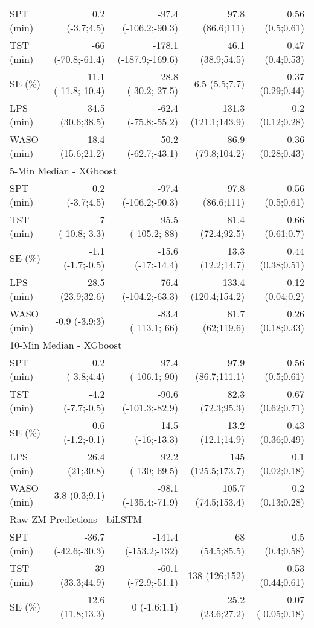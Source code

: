 \documentclass[
  9pt,
]{scrbook}
\begin{document}
\begin{longtable}{lrrrr}
\midrule
SPT (min) & 0.2 (-3.7;4.5) & -97.4 (-106.2;-90.3) & 97.8 (86.6;111) & 0.56 (0.5;0.61) \\ 
TST (min) & -66 (-70.8;-61.4) & -178.1 (-187.9;-169.6) & 46.1 (38.9;54.5) & 0.47 (0.4;0.53) \\ 
SE (\%) & -11.1 (-11.8;-10.4) & -28.8 (-30.2;-27.5) & 6.5 (5.5;7.7) & 0.37 (0.29;0.44) \\ 
LPS (min) & 34.5 (30.6;38.5) & -62.4 (-75.8;-55.2) & 131.3 (121.1;143.9) & 0.2 (0.12;0.28) \\ 
WASO (min) & 18.4 (15.6;21.2) & -50.2 (-62.7;-43.1) & 86.9 (79.8;104.2) & 0.36 (0.28;0.43) \\ 
\midrule
\multicolumn{5}{l}{5-Min Median - XGboost} \\ 
\midrule
SPT (min) & 0.2 (-3.7;4.5) & -97.4 (-106.2;-90.3) & 97.8 (86.6;111) & 0.56 (0.5;0.61) \\ 
TST (min) & -7 (-10.8;-3.3) & -95.5 (-105.2;-88) & 81.4 (72.4;92.5) & 0.66 (0.61;0.7) \\ 
SE (\%) & -1.1 (-1.7;-0.5) & -15.6 (-17;-14.4) & 13.3 (12.2;14.7) & 0.44 (0.38;0.51) \\ 
LPS (min) & 28.5 (23.9;32.6) & -76.4 (-104.2;-63.3) & 133.4 (120.4;154.2) & 0.12 (0.04;0.2) \\ 
WASO (min) & -0.9 (-3.9;3) & -83.4 (-113.1;-66) & 81.7 (62;119.6) & 0.26 (0.18;0.33) \\ 
\midrule
\multicolumn{5}{l}{10-Min Median - XGboost} \\ 
\midrule
SPT (min) & 0.2 (-3.8;4.4) & -97.4 (-106.1;-90) & 97.9 (86.7;111.1) & 0.56 (0.5;0.61) \\ 
TST (min) & -4.2 (-7.7;-0.5) & -90.6 (-101.3;-82.9) & 82.3 (72.3;95.3) & 0.67 (0.62;0.71) \\ 
SE (\%) & -0.6 (-1.2;-0.1) & -14.5 (-16;-13.3) & 13.2 (12.1;14.9) & 0.43 (0.36;0.49) \\ 
LPS (min) & 26.4 (21;30.8) & -92.2 (-130;-69.5) & 145 (125.5;173.7) & 0.1 (0.02;0.18) \\ 
WASO (min) & 3.8 (0.3;9.1) & -98.1 (-135.4;-71.9) & 105.7 (74.5;153.4) & 0.2 (0.13;0.28) \\ 
\midrule
\multicolumn{5}{l}{Raw ZM Predictions - biLSTM} \\ 
\midrule
SPT (min) & -36.7 (-42.6;-30.3) & -141.4 (-153.2;-132) & 68 (54.5;85.5) & 0.5 (0.4;0.58) \\ 
TST (min) & 39 (33.3;44.9) & -60.1 (-72.9;-51.1) & 138 (126;152) & 0.53 (0.44;0.61) \\ 
SE (\%) & 12.6 (11.8;13.3) & 0 (-1.6;1.1) & 25.2 (23.6;27.2) & 0.07 (-0.05;0.18) \\ 

\end{longtable}
\end{document}
